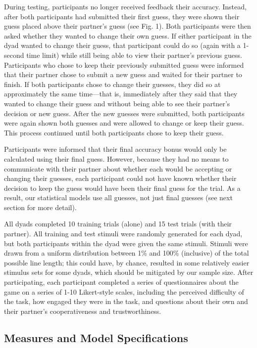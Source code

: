 \documentclass[10pt, letterpaper]{article}
\begin{document}
During testing, participants no longer received feedback their accuracy.
Instead, after both participants had submitted their first guess, they
were shown their guess placed above their partner's guess (see Fig. 1).
Both participants were then asked whether they wanted to change their
own guess. If either participant in the dyad wanted to change their
guess, that participant could do so (again with a 1-second time limit)
while still being able to view their partner's previous guess.
Participants who chose to keep their previously submitted guess were
informed that their partner chose to submit a new guess and waited for
their partner to finish. If both participants chose to change their
guesses, they did so at approximately the same time---that is,
immediately after they said that they wanted to change their guess and
without being able to see their partner's decision or new guess. After
the new guesses were submitted, both participants were again shown both
guesses and were allowed to change or keep their guess. This process
continued until both participants chose to keep their guess.

Participants were informed that their final accuracy bonus would only be
calculated using their final guess. However, because they had no means
to communicate with their partner about whether each would be accepting
or changing their guesses, each participant could not have known whether
their decision to keep the guess would have been their final guess for
the trial. As a result, our statistical models use all guesses, not just
final guesses (see next section for more detail).

All dyads completed 10 training trials (alone) and 15 test trials (with
their partner). All training and test stimuli were randomly generated
for each dyad, but both participants within the dyad were given the same
stimuli. Stimuli were drawn from a uniform distribution between 1\% and
100\% (inclusive) of the total possible line length; this could have, by
chance, resulted in some relatively easier stimulus sets for some dyads,
which should be mitigated by our sample size. After participating, each
participant completed a series of questionnaires about the game on a
series of 1-10 Likert-style scales, including the perceived difficulty
of the task, how engaged they were in the task, and questions about
their own and their partner's cooperativeness and trustworthiness.

\subsection{Measures and Model
Specifications}\label{measures-and-model-specifications}
\end{document}
